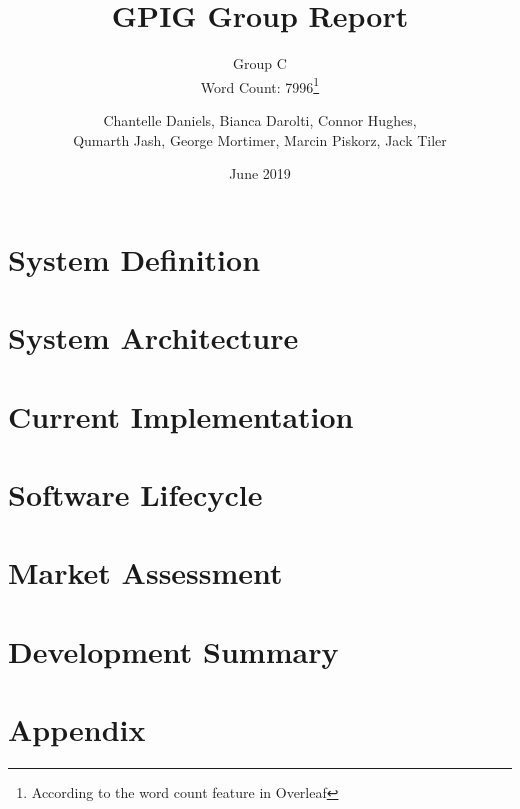 \documentclass{UoYCSproject}
\title{GPIG Group Report}
\subtitle{Group C\\ Word Count: 7996\thanks{According to the word count feature in Overleaf}}
\author{Chantelle Daniels, Bianca Darolti, Connor Hughes,\\ Qumarth Jash, George Mortimer, Marcin Piskorz, Jack Tiler}
\date{June 2019}
\begin{document}
\maketitle
{}
\chapter{System Definition} \label{systemdef}


\chapter{System Architecture} \label{systemarch}


\chapter{Current Implementation} \label{currentimp}


\chapter{Software Lifecycle} \label{softwarelife}


\chapter{Market Assessment} \label{market}


\chapter{Development Summary} \label{devsummary}


\appendix
\chapter{Appendix}



\printbibliography
\end{document}
